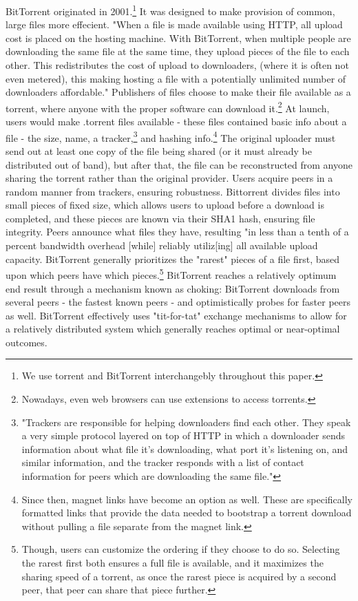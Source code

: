 \documentclass[12pt]{report}
\begin{document}
BitTorrent originated in 2001.\footnote{We use torrent and BitTorrent interchangebly throughout this paper.} It was designed to make provision of common, large files more effecient. "When a file is made available using HTTP, all upload cost is placed on the hosting machine. With BitTorrent, when multiple people are downloading the same file at the same time, they upload pieces of the file to each other. This redistributes the cost of upload to downloaders, (where it is often not even metered), this making hosting a file with a potentially unlimited number of downloaders affordable."\cite{torrent} Publishers of files choose to make their file available as a torrent, where anyone with the proper software can download it.\footnote{Nowadays, even web browsers can use extensions to access torrents.\cite{webtorrent}} At launch, users would make .torrent files available - these files contained basic info about a file - the size, name, a tracker,\footnote{"Trackers are responsible for helping downloaders find each other. They speak a very simple protocol layered on top of HTTP in which a downloader sends information about what file it’s downloading, what port it’s listening on, and similar information, and the tracker responds with a list of contact information for peers which are downloading the same file."\cite{torrent}} and hashing info.\footnote{Since then, magnet links have become an option as well. These are specifically formatted links that provide the data needed to bootstrap a torrent download without pulling a file separate from the magnet link.}\cite{torrent} The original uploader must send out at least one copy of the file being shared (or it must already be distributed out of band), but after that, the file can be reconstructed from anyone sharing the torrent rather than the original provider. Users acquire peers in a random manner from trackers, ensuring robustness. Bittorrent divides files into small pieces of fixed size, which allows users to upload before a download is completed, and these pieces are known via their SHA1 hash, ensuring file integrity. Peers announce what files they have, resulting "in less than a tenth of a percent bandwidth overhead [while] reliably utiliz[ing] all available upload capacity.\cite{torrent} BitTorrent generally prioritizes the "rarest" pieces of a file first, based upon which peers have which pieces.\footnote{Though, users can customize the ordering if they choose to do so. Selecting the rarest first both ensures a full file is available, and it maximizes the sharing speed of a torrent, as once the rarest piece is acquired by a second peer, that peer can share that piece further.} BitTorrent reaches a relatively optimum end result through a mechanism known as choking: BitTorrent downloads from several peers - the fastest known peers - and optimistically probes for faster peers as well.\cite{torrent} BitTorrent effectively uses "tit-for-tat" exchange mechanisms to allow for a relatively distributed system which generally reaches optimal or near-optimal outcomes.
\end{document}
